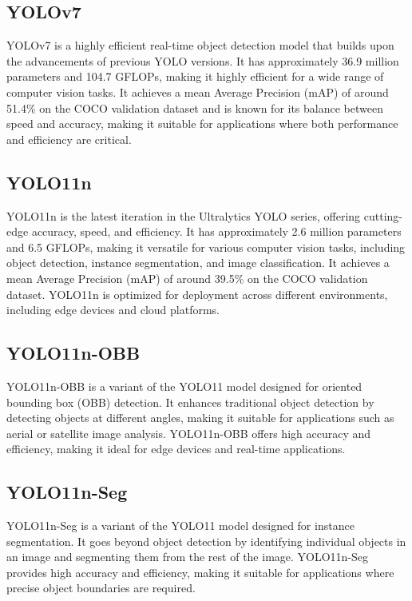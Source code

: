 \subsection{YOLOv7}
YOLOv7 is a highly efficient real-time object detection model that builds upon the advancements of previous YOLO versions. It has approximately 36.9 million parameters and 104.7 GFLOPs, making it highly efficient for a wide range of computer vision tasks. It achieves a mean Average Precision (mAP) of around 51.4\% on the COCO validation dataset and is known for its balance between speed and accuracy, making it suitable for applications where both performance and efficiency are critical.\cite{wang2022yolov7}

\subsection{YOLO11n}
YOLO11n is the latest iteration in the Ultralytics YOLO series, offering cutting-edge accuracy, speed, and efficiency. It has approximately 2.6 million parameters and 6.5 GFLOPs, making it versatile for various computer vision tasks, including object detection, instance segmentation, and image classification. It achieves a mean Average Precision (mAP) of around 39.5\% on the COCO validation dataset. YOLO11n is optimized for deployment across different environments, including edge devices and cloud platforms.\cite{khanam2024yolov11,yolo11_ultralytics}

\subsection{YOLO11n-OBB}
YOLO11n-OBB is a variant of the YOLO11 model designed for oriented bounding box (OBB) detection. It enhances traditional object detection by detecting objects at different angles, making it suitable for applications such as aerial or satellite image analysis. YOLO11n-OBB offers high accuracy and efficiency, making it ideal for edge devices and real-time applications.\cite{khanam2024yolov11,yolo11_ultralytics}

\subsection{YOLO11n-Seg}
YOLO11n-Seg is a variant of the YOLO11 model designed for instance segmentation. It goes beyond object detection by identifying individual objects in an image and segmenting them from the rest of the image. YOLO11n-Seg provides high accuracy and efficiency, making it suitable for applications where precise object boundaries are required.\cite{khanam2024yolov11,yolo11_ultralytics}



